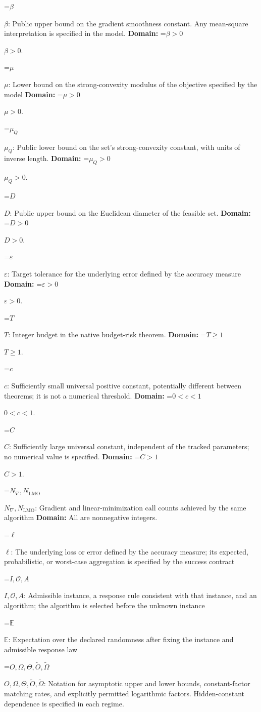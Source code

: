 \documentclass[10pt,a4paper]{article}
\newcommand{\AtlasMath}[1]{\par\begingroup\centering\setbox0=\hbox{$\displaystyle #1$}\ifdim\wd0>1.4\linewidth\typeout{ATLAS WIDE FORMULA: \the\wd0}\fi\ifdim\wd0>\linewidth\resizebox{\linewidth}{!}{\box0}\else\box0\fi\par\endgroup}
\newcommand{\AtlasInlineMath}[1]{\begingroup\setbox0=\hbox{$#1$}\ifdim\wd0>.4\linewidth\endgroup\AtlasMath{#1}\else\endgroup$#1$\fi}
\begin{document}
\AtlasInlineMath{\beta}: Public upper bound on the gradient smoothness constant. Any mean-square interpretation is specified in the model. \textbf{Domain:} \AtlasInlineMath{\beta>0}.

\AtlasInlineMath{\mu}: Lower bound on the strong-convexity modulus of the objective specified by the model \textbf{Domain:} \AtlasInlineMath{\mu>0}.

\AtlasInlineMath{\mu_Q}: Public lower bound on the set's strong-convexity constant, with units of inverse length. \textbf{Domain:} \AtlasInlineMath{\mu_Q>0}.

\AtlasInlineMath{D}: Public upper bound on the Euclidean diameter of the feasible set. \textbf{Domain:} \AtlasInlineMath{D>0}.

\AtlasInlineMath{\varepsilon}: Target tolerance for the underlying error defined by the accuracy measure \textbf{Domain:} \AtlasInlineMath{\varepsilon>0}.

\AtlasInlineMath{T}: Integer budget in the native budget-risk theorem. \textbf{Domain:} \AtlasInlineMath{T\ge1}.

\AtlasInlineMath{c}: Sufficiently small universal positive constant, potentially different between theorems; it is not a numerical threshold. \textbf{Domain:} \AtlasInlineMath{0<c<1}.

\AtlasInlineMath{C}: Sufficiently large universal constant, independent of the tracked parameters; no numerical value is specified. \textbf{Domain:} \AtlasInlineMath{C>1}.

\AtlasInlineMath{N_{\nabla},N_{\mathrm{LMO}}}: Gradient and linear-minimization call counts achieved by the same algorithm \textbf{Domain:} All are nonnegative integers.

\AtlasInlineMath{\ell}: The underlying loss or error defined by the accuracy measure; its expected, probabilistic, or worst-case aggregation is specified by the success contract

\AtlasInlineMath{I,\mathcal{O},A}: Admissible instance, a response rule consistent with that instance, and an algorithm; the algorithm is selected before the unknown instance

\AtlasInlineMath{\mathbb{E}}: Expectation over the declared randomness after fixing the instance and admissible response law

\AtlasInlineMath{O,\Omega,\Theta,\widetilde{O},\widetilde\Omega}: Notation for asymptotic upper and lower bounds, constant-factor matching rates, and explicitly permitted logarithmic factors. Hidden-constant dependence is specified in each regime.
\end{document}
